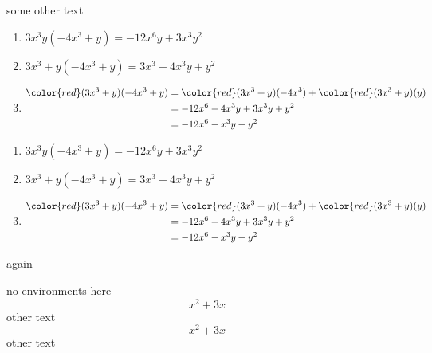 some
other
text
\begin{enumerate}
	\item $3x^3y(-4x^3+y) = -12x^6y+3x^3y^2$
	\item $3x^3+y(-4x^3+y) = 3x^3-4x^3y+y^2$
	\item
	      \begin{align*}
		      {\color{red}(3x^3+y)}(-4x^3+y) & =	{\color{red}(3x^3+y)}(-4x^3)+{\color{red}(3x^3+y)}(y)\\
		                                     & =	-12x^6-4x^3y+3x^3y+y^2\\
		                                     & =	-12x^6-x^3y+y^2
	      \end{align*}
\end{enumerate}
\begin{enumerate}
	\item $3x^3y(-4x^3+y) = -12x^6y+3x^3y^2$
	\item $3x^3+y(-4x^3+y) = 3x^3-4x^3y+y^2$
	\item
	      \begin{align*}
		      {\color{red}(3x^3+y)}(-4x^3+y) & =	{\color{red}(3x^3+y)}(-4x^3)+{\color{red}(3x^3+y)}(y)\\
		                                     & =	-12x^6-4x^3y+3x^3y+y^2\\
		                                     & =	-12x^6-x^3y+y^2
	      \end{align*}
\end{enumerate}

\begin{something}
	\begin{else}
		again
	\end{else}
\end{something}
no
environments
here
\[ x^2+ 3x\]
other text
\[
	x^2+ 3x
\]
other text
